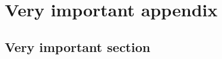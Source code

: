 \documentclass[debug]{phd}
\begin{document}
	\chapter{Very important appendix}
	\label{app:notation}
			
			\section{Very important section}\label{app:constrcoo}
				

\end{document}
